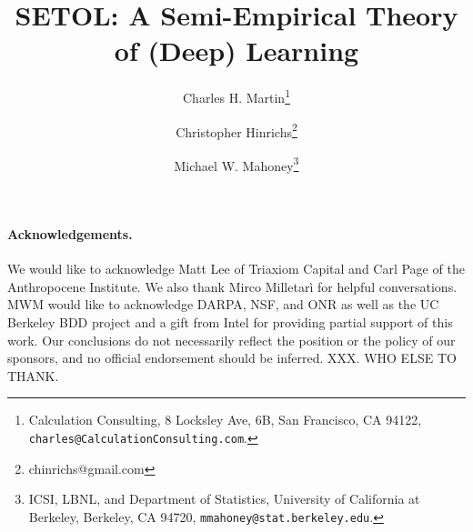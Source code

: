 \documentclass[11pt]{article}
\begin{document}
\title{%
SETOL: A Semi-Empirical Theory of (Deep) Learning
}

\author{%
Charles H. Martin\thanks{Calculation Consulting, 8 Locksley Ave, 6B, San Francisco, CA 94122, \texttt{charles@CalculationConsulting.com}.} 
\and
Christopher Hinrichs\thanks{chinrichs@gmail.com}
\and
Michael W. Mahoney\thanks{ICSI, LBNL, and Department of Statistics, University of California at Berkeley, Berkeley, CA 94720, \texttt{mmahoney@stat.berkeley.edu}.}
}

\date{}
\maketitle

\begin{abstract}

\end{abstract}

\newpage
\tableofcontents


\newpage

\newpage

\newpage

\newpage

\newpage

\newpage

\newpage


\noindent
\paragraph{Acknowledgements.}
We would like to acknowledge Matt Lee of Triaxiom Capital and Carl Page of the Anthropocene Institute.
We also thank Mirco Milletarì for helpful conversations.
MWM would like to acknowledge DARPA, NSF, and ONR as well as the UC Berkeley BDD project and a gift from Intel for providing partial support of this work.
Our conclusions do not necessarily reflect the position or the policy of our sponsors, and no official endorsement should be inferred.
XXX.  WHO ELSE TO THANK.



%
{\small
%

%
}


\appendix




\end{document}
